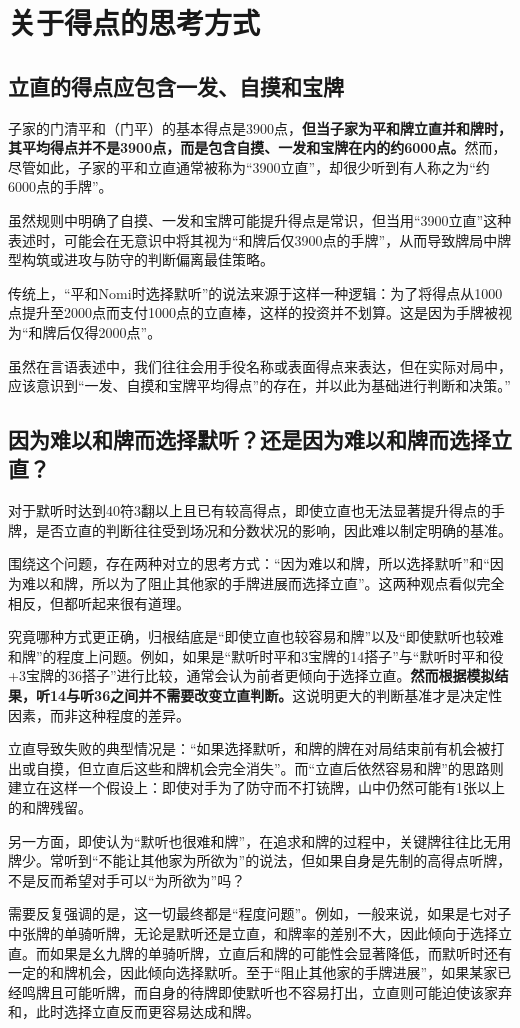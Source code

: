 \section{关于得点的思考方式}
\subsection{立直的得点应包含一发、自摸和宝牌}
子家的门清平和（门平）的基本得点是3900点，\textbf{但当子家为平和牌立直并和牌时，其平均得点并不是3900点，而是包含自摸、一发和宝牌在内的约6000点。}然而，尽管如此，子家的平和立直通常被称为“3900立直”，却很少听到有人称之为“约6000点的手牌”。

虽然规则中明确了自摸、一发和宝牌可能提升得点是常识，但当用“3900立直”这种表述时，可能会在无意识中将其视为“和牌后仅3900点的手牌”，从而导致牌局中牌型构筑或进攻与防守的判断偏离最佳策略。

传统上，“平和Nomi时选择默听”的说法来源于这样一种逻辑：为了将得点从1000点提升至2000点而支付1000点的立直棒，这样的投资并不划算。这是因为手牌被视为“和牌后仅得2000点”。

虽然在言语表述中，我们往往会用手役名称或表面得点来表达，但在实际对局中，应该意识到“一发、自摸和宝牌平均得点”的存在，并以此为基础进行判断和决策。”

\subsection{因为难以和牌而选择默听？还是因为难以和牌而选择立直？}
对于默听时达到40符3翻以上且已有较高得点，即使立直也无法显著提升得点的手牌，是否立直的判断往往受到场况和分数状况的影响，因此难以制定明确的基准。

围绕这个问题，存在两种对立的思考方式：“因为难以和牌，所以选择默听”和“因为难以和牌，所以为了阻止其他家的手牌进展而选择立直”。这两种观点看似完全相反，但都听起来很有道理。

究竟哪种方式更正确，归根结底是“即使立直也较容易和牌”以及“即使默听也较难和牌”的程度上问题。例如，如果是“默听时平和3宝牌的14搭子”与“默听时平和役+3宝牌的36搭子”进行比较，通常会认为前者更倾向于选择立直。\textbf{然而根据模拟结果，听14与听36之间并不需要改变立直判断。}这说明更大的判断基准才是决定性因素，而非这种程度的差异。

立直导致失败的典型情况是：“如果选择默听，和牌的牌在对局结束前有机会被打出或自摸，但立直后这些和牌机会完全消失”。而“立直后依然容易和牌”的思路则建立在这样一个假设上：即使对手为了防守而不打铳牌，山中仍然可能有1张以上的和牌残留。

另一方面，即使认为“默听也很难和牌”，在追求和牌的过程中，关键牌往往比无用牌少。常听到“不能让其他家为所欲为”的说法，但如果自身是先制的高得点听牌，不是反而希望对手可以“为所欲为”吗？

需要反复强调的是，这一切最终都是“程度问题”。例如，一般来说，如果是七对子中张牌的单骑听牌，无论是默听还是立直，和牌率的差别不大，因此倾向于选择立直。而如果是幺九牌的单骑听牌，立直后和牌的可能性会显著降低，而默听时还有一定的和牌机会，因此倾向选择默听。至于“阻止其他家的手牌进展”，如果某家已经鸣牌且可能听牌，而自身的待牌即使默听也不容易打出，立直则可能迫使该家弃和，此时选择立直反而更容易达成和牌。
